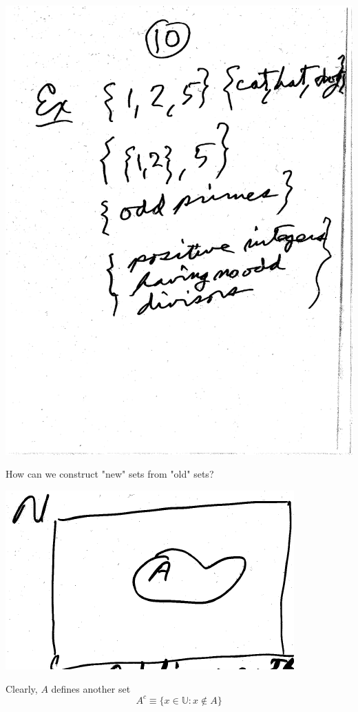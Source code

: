 \documentclass[10pt,a4paper]{article}
\begin{document}
\includegraphics[scale=.5]{Pages/ST_10}

\newpage

\noindent How can we construct "new" sets from "old" sets?

\includegraphics[scale=.5]{Pages/ST_11_im1}

\noindent Clearly, $A$ defines another set $$ A^c \equiv \{ x \in \mathbb{U}: x \notin A\} $$
\end{document}
